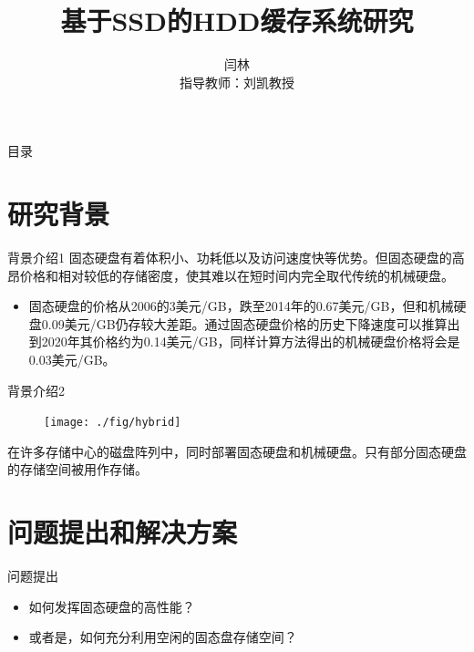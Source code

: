 \documentclass[compress]{beamer}
\title{基于SSD的HDD缓存系统研究}
\author{
闫林\\
指导教师：刘凯教授
}
\institute{
计算机学院\\
西安电子科技大学\\
}
\begin{document}
\begin{frame}[plain] %
  \titlepage
\end{frame}

\begin{frame}{目录}
  \tableofcontents
\end{frame}


\section{研究背景}
\begin{frame}{背景介绍1}
固态硬盘有着体积小、功耗低以及访问速度快等优势。但固态硬盘的高昂价格和相对较低的存储密度，使其难以在短时间内完全取代传统的机械硬盘。
\begin{itemize}
    \item 固态硬盘的价格从2006的3美元/GB，跌至2014年的0.67美元/GB，但和机械硬盘0.09美元/GB仍存较大差距。通过固态硬盘价格的历史下降速度可以推算出到2020年其价格约为0.14美元/GB，同样计算方法得出的机械硬盘价格将会是0.03美元/GB。
\end{itemize}
\end{frame}

\begin{frame}{背景介绍2}
\begin{figure}
\texttt{[image: ./fig/hybrid]}
\end{figure}
在许多存储中心的磁盘阵列中，同时部署固态硬盘和机械硬盘。只有部分固态硬盘的存储空间被用作存储。
\end{frame}

\section{问题提出和解决方案}
\begin{frame}{问题提出}
\begin{itemize}
    \item 如何发挥固态硬盘的高性能？
    \item 或者是，如何充分利用空闲的固态盘存储空间？
\end{itemize}
\end{frame}
\end{document}
